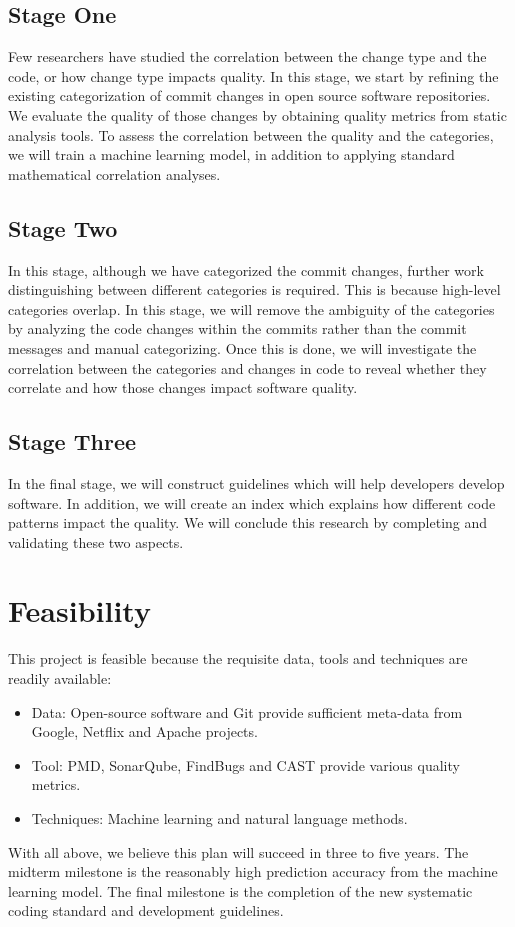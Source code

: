 \documentclass[10pt,conference]{IEEEtran}
\begin{document}
\subsection{Stage One}
Few researchers have studied the correlation between the change type and the code, or how change type impacts quality. 
In this stage, we start by refining the existing categorization of commit changes in open source software repositories.
We evaluate the quality of those changes by obtaining quality metrics from static analysis tools.
To assess the correlation between the quality and the categories, we will train a machine learning model, in addition to applying standard mathematical correlation analyses.

\subsection{Stage Two}
In this stage, although we have categorized the commit changes, further work distinguishing between different categories is required.
This is because high-level categories overlap.
In this stage, we will remove the ambiguity of the categories by analyzing the code changes within the commits rather than the commit messages and manual categorizing.
Once this is done, we will investigate the correlation between the categories and changes in code to reveal whether they correlate and how those changes impact software quality.

\subsection{Stage Three}
In the final stage, we will construct guidelines which will help developers develop software.
In addition, we will create an index which explains how different code patterns impact the quality.
We will conclude this research by completing and validating these two aspects. 

\section{Feasibility}
This project is feasible because the requisite data, tools and techniques are readily available:
\begin{itemize}
    \item Data: Open-source software and Git provide sufficient meta-data from Google, Netflix and Apache projects.
    \item Tool: PMD, SonarQube, FindBugs and CAST provide various quality metrics.
    \item Techniques: Machine learning and natural language methods.
\end{itemize}
With all above, we believe this plan will succeed in three to five years.
The midterm milestone is the reasonably high prediction accuracy from the machine learning model.
The final milestone is the completion of the new systematic coding standard and development guidelines.
\end{document}
